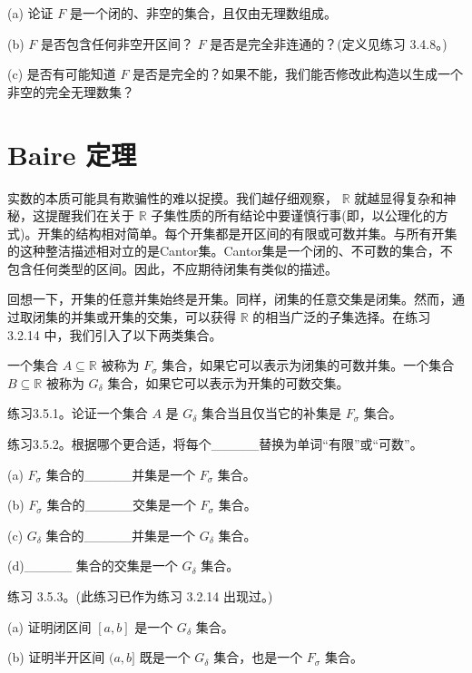 (a) 论证 \(F\) 是一个闭的、非空的集合，且仅由无理数组成。

(b) \(F\) 是否包含任何非空开区间？ \(F\) 是否是完全非连通的？(定义见练习 3.4.8。)

(c) 是否有可能知道 \(F\) 是否是完全的？如果不能，我们能否修改此构造以生成一个非空的完全无理数集？

\section{Baire 定理}
\label{sec:3.5}
实数的本质可能具有欺骗性的难以捉摸。我们越仔细观察， \(\mathbb{R}\) 就越显得复杂和神秘，这提醒我们在关于 \(\mathbb{R}\) 子集性质的所有结论中要谨慎行事(即，以公理化的方式)。开集的结构相对简单。每个开集都是开区间的有限或可数并集。与所有开集的这种整洁描述相对立的是Cantor集。Cantor集是一个闭的、不可数的集合，不包含任何类型的区间。因此，不应期待闭集有类似的描述。

回想一下，开集的任意并集始终是开集。同样，闭集的任意交集是闭集。然而，通过取闭集的并集或开集的交集，可以获得 \(\mathbb{R}\) 的相当广泛的子集选择。在练习 3.2.14 中，我们引入了以下两类集合。

\begin{Def}
  \label{def:3.5.1}
  一个集合 \(A \subseteq  \mathbb{R}\) 被称为 \({F}_{\sigma }\) 集合，如果它可以表示为闭集的可数并集。一个集合 \(B \subseteq  \mathbb{R}\) 被称为 \({G}_{\delta }\) 集合，如果它可以表示为开集的可数交集。
\end{Def}

练习3.5.1。论证一个集合 \(A\) 是 \({G}_{\delta }\) 集合当且仅当它的补集是 \({F}_{\sigma }\) 集合。

练习3.5.2。根据哪个更合适，将每个\_\_\_\_\_替换为单词“有限”或“可数”。

(a) \({F}_{\sigma }\) 集合的\_\_\_\_\_并集是一个 \({F}_{\sigma }\) 集合。

(b) \({F}_{\sigma }\) 集合的\_\_\_\_\_交集是一个 \({F}_{\sigma }\) 集合。

(c) \({G}_{\delta }\) 集合的\_\_\_\_\_并集是一个 \({G}_{\delta }\) 集合。

(d)\_\_\_\_\_ 集合的交集是一个 \({G}_{\delta }\) 集合。

练习 3.5.3。(此练习已作为练习 3.2.14 出现过。)

(a) 证明闭区间 \(\left\lbrack  {a,b}\right\rbrack\) 是一个 \({G}_{\delta }\) 集合。

(b) 证明半开区间 \((a,b\rbrack\) 既是一个 \({G}_{\delta }\) 集合，也是一个 \({F}_{\sigma }\) 集合。

